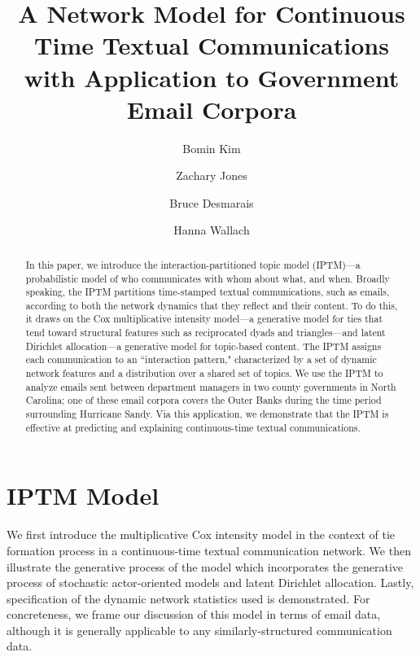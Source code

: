 \documentclass[a4paper]{article}
\title{A Network Model for Continuous Time Textual Communications\\ with Application to Government Email Corpora}
\author[1]{Bomin Kim}
\author[1]{Zachary Jones}
\author[1]{Bruce Desmarais}
\author[2,3]{Hanna Wallach}
\affil[1]{Pennsylvania State University}
\affil[2]{Microsoft Research NYC}
\affil[3]{University of Massachusetts Amherst}
\begin{document}
\maketitle
\begin{abstract}
	
	\noindent In this paper, we introduce the interaction-partitioned topic model
	(IPTM)---a probabilistic model of who communicates with whom about
	what, and when. Broadly speaking, the IPTM partitions time-stamped
	textual communications, such as emails, according to both the network
	dynamics that they reflect and their content. To do this, it draws on
	the Cox multiplicative intensity model---a generative model for ties
	that tend toward structural features such as reciprocated dyads and
	triangles---and latent Dirichlet allocation---a generative model for
	topic-based content. The IPTM assigns each communication to an
	``interaction pattern," characterized by a set of dynamic network
	features and a distribution over a shared set of topics. We use the
	IPTM to analyze emails sent between department managers in two county
	governments in North Carolina; one of these email corpora covers the
	Outer Banks during the time period surrounding Hurricane Sandy. Via
	this application, we demonstrate that the IPTM is effective at
	predicting and explaining continuous-time textual communications.	
\end{abstract}
\section{IPTM Model} \label{sec: IPTM Model}
We first introduce the multiplicative Cox intensity model in the context of tie formation process in a continuous-time textual communication network. We then illustrate the generative process of the model which incorporates the generative process of stochastic actor-oriented models and latent Dirichlet allocation. Lastly, specification of the dynamic network statistics used is demonstrated. For concreteness, we frame our discussion of this model in terms of email data, although it is generally applicable to any similarly-structured communication data.
\end{document}
